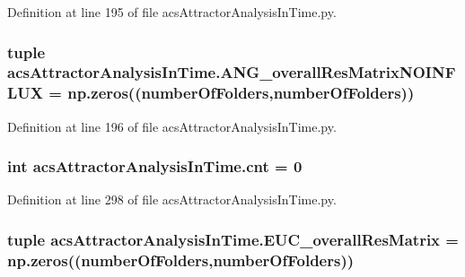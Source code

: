 Definition at line 195 of file acs\-Attractor\-Analysis\-In\-Time.\-py.

\hypertarget{a00091_a7b0e67be0cf8de69432bdf56919d9e33}{
\subsubsection[{A\-N\-G\-\_\-overall\-Res\-Matrix\-N\-O\-I\-N\-F\-L\-U\-X}]{\setlength{\rightskip}{0pt plus 5cm}tuple acs\-Attractor\-Analysis\-In\-Time.\-A\-N\-G\-\_\-overall\-Res\-Matrix\-N\-O\-I\-N\-F\-L\-U\-X = np.\-zeros(({\bf number\-Of\-Folders},{\bf number\-Of\-Folders}))}}\label{a00091_a7b0e67be0cf8de69432bdf56919d9e33}


Definition at line 196 of file acs\-Attractor\-Analysis\-In\-Time.\-py.

\hypertarget{a00091_aabada0bdbcd7fb71d37a9310d32f0a28}{
\subsubsection[{cnt}]{\setlength{\rightskip}{0pt plus 5cm}int acs\-Attractor\-Analysis\-In\-Time.\-cnt = 0}}\label{a00091_aabada0bdbcd7fb71d37a9310d32f0a28}


Definition at line 298 of file acs\-Attractor\-Analysis\-In\-Time.\-py.

\hypertarget{a00091_a63ee1925f76a40d04495e9b35c0973d2}{
\subsubsection[{E\-U\-C\-\_\-overall\-Res\-Matrix}]{\setlength{\rightskip}{0pt plus 5cm}tuple acs\-Attractor\-Analysis\-In\-Time.\-E\-U\-C\-\_\-overall\-Res\-Matrix = np.\-zeros(({\bf number\-Of\-Folders},{\bf number\-Of\-Folders}))}}\label{a00091_a63ee1925f76a40d04495e9b35c0973d2}



